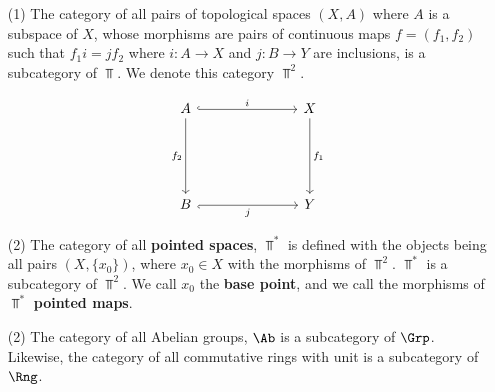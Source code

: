 \begin{example}\label{1.2}
    \begin{enumerate}
        \item[(1)] The category of all pairs of topological spaces $(X,A)$ where
            $A$ is a subspace of $X$, whose morphisms are pairs of continuous
            maps $f=(f_1,f_2)$ such that $f_1i=jf_2$ where $i:A \xrightarrow{}
            X$ and $j:B \xrightarrow{} Y$ are inclusions, is a subcategory of
            $\Top$. We denote this category  $\Top^2$.

            \[\begin{tikzcd}
                A &&& X \\
                \\
                \\
                B &&& Y
                \arrow["i", hook, from=1-1, to=1-4]
                \arrow["j"', hook', from=4-1, to=4-4]
                \arrow["{f_1}", from=1-4, to=4-4]
                \arrow["{f_2}"', from=1-1, to=4-1]
            \end{tikzcd}\]

        \item[(2)] The category of all \textbf{pointed spaces}, $\Top^*$ is
            defined with the objects being all pairs  $(X,\{x_0\})$, where $x_0
            \in X$ with the morphisms of $\Top^2$.  $\Top^*$ is a subcategory of
            $\Top^2$. We call $x_0$ the \textbf{base point}, and we call the
            morphisms of  $\Top^*$  \textbf{pointed maps}.

        \item[(2)] The category of all Abelian groups, $\Ab$ is a subcategory of
             $\Grp$. Likewise, the category of all commutative rings with unit
             is a subcategory of $\Rng$.
    \end{enumerate}
\end{example}
